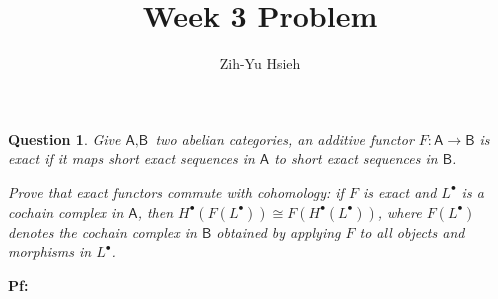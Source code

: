 \documentclass{article}
\title{Week 3 Problem}
\author{Zih-Yu Hsieh}
\newtheorem{question}{Question}
\newcommand{\cat}[1]{\textsf{#1}}
\begin{document}
\maketitle

\section{}
\begin{question}\label{q1}
    Give $\cat{A},\cat{B}$ two abelian categories, an additive functor $F:\cat{A}\rightarrow\cat{B}$ is exact if it maps short exact sequences in $\cat{A}$ to short exact sequences in $\cat{B}$.

    Prove that exact functors commute with cohomology: if $F$ is exact and $L^\bullet$ is a cochain complex in $\cat{A}$, then $H^\bullet(F(L^\bullet))\cong F(H^\bullet(L^\bullet))$, where $F(L^\bullet)$ denotes the cochain complex in $\cat{B}$ obtained by applying $F$ to all objects and morphisms in $L^\bullet$.
\end{question}

\textbf{Pf:}
\end{document}
